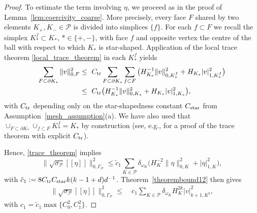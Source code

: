 \documentclass[11pt,final]{amsart}
\theoremstyle{plain}
\theoremstyle{definition}
\newcommand\calP{{\mathcal{P}}}
\newcommand{\mesh}{\calP}
\newcommand{\jump}[1]{[\![#1]\!]}                        %
\newcommand{\norm}[2]{\|{#1}\|_{{#2}}}
\renewcommand{\k}{K}
\newcommand{\ksh}{{K^{\sharp}}}
\begin{document}
\begin{proof}
To estimate the term involving $\eta$, we proceed as in the proof of
Lemma~\ref{lem:coercivity_coarse}. More precisely, every face $F$ shared
by two elements $\k_+,\k_-\in\mesh$ is divided into simplices $\{ f\}$.
For each $f\subset F$ we recall the simplex $\k_*^f\subset \k_*$,
$*\in\{+,-\}$, with face $f$ and opposite vertex the centre of the ball
with respect to which $\k_*$ is star-shaped. Application of the local
trace theorem \eqref{local_trace_theorem} in each $\k_*^f$ yields
\begin{align}
	\sum_{F\subset \partial K_*}\norm{v}{0,F}^2
&\le\ C_{\rm tr} \sum_{F\subset \partial K_*}\sum_{f\subset F}\big(H_{\k_*}^{-1} \norm{v}{0,\k_*^f}^2+ H_{\k_*} | v|_{1,\k_*^f}^2 \big)\nonumber\\
&\le\ C_{\rm tr} \big(H_{\k_*}^{-1} \norm{v}{0,\k_*}^2+ H_{\k_*} | v|_{1,\k_*}^2 \big),\label{trace_theorem}
\end{align}
with $C_{\rm tr}$ depending only on the star-shapedness constant
$C_{\rm star}$ from Assumption~\ref{mesh_assumption}(a). We have also
used that
$\cup_{F\subset \partial\k_*}\cup_{f\subset F}\k_*^f=\k_*$ by
construction (see, e.g., \cite[Lemma 4.7]{DG-EASE} for a proof of the
trace theorem with explicit $C_{\rm tr}$).

Hence, \eqref{trace_theorem} implies
\[
\norm{\sqrt{\sigma_\mesh}\jump{\eta}}{0,\Gamma_\mesh}^2
\le 
\tilde{c}_1\sum_{\k\in\mesh} \delta_{\omega_\k}\big(
H_{\k}^{-2}\norm{\eta}{0,\k}^2+|\eta|_{1,\k}^2\big), 
\]
with  $\tilde{c}_1:= 8 C_{\rm tr}C_{\rm star}k(k-1+d)d^{-1}$.
Theorem~\ref{theorembound12} then gives
\begin{equation}\label{pen_one_error}
\begin{aligned}
	\norm{\sqrt{\sigma_\mesh}\jump{\eta}}{0,\Gamma_\mesh}^2
	\le &\ 
	c_1\sum_{\k\in\mesh} \delta_{\omega_\k}H_{\k}^{2k} |v|_{k+1,\ksh}^2  
	,
\end{aligned}
\end{equation}
with $c_1=\tilde{c}_1\max\{C_0^2,C_1^2\}$.


\end{proof}
\end{document}
